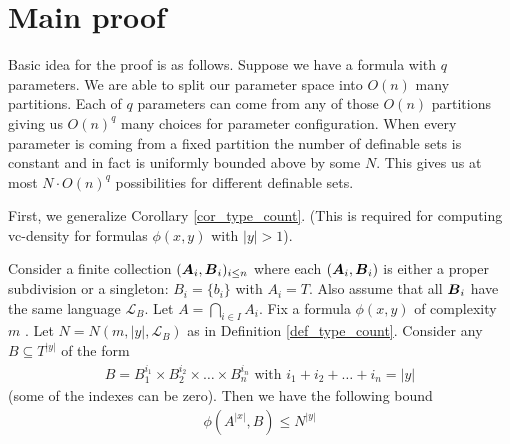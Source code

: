 \documentclass{amsart}
\DeclareMathOperator{\A}{\boldface A}
\DeclareMathOperator{\B}{\boldface B}
\renewcommand{\LL}{\mathcal L}
\begin{document}
\section{Main proof}

Basic idea for the proof is as follows. Suppose we have a formula with $q$ parameters. We are able to split our parameter space into $O(n)$ many partitions. Each of $q$ parameters can come from any of those $O(n)$ partitions giving us $O(n)^q$ many choices for parameter configuration. When every parameter is coming from a fixed partition the number of definable sets is constant and in fact is uniformly bounded above by some $N$. This gives us at most $N \cdot O(n)^q$ possibilities for different definable sets.

First, we generalize Corollary \ref{cor_type_count}. (This is required for computing vc-density for formulas $\phi(x, y)$ with $|y| > 1$).

\begin{Lemma} \label{lm_partition_bound}
	Consider a finite collection $(\A_i, \B_i)_{i \leq n}$ where each $(\A_i, \B_i)$ is either a proper subdivision or a singleton: $B_i = \{b_i\}$ with $A_i = T$. Also assume that all $\B_i$ have the same language $\LL_B$. Let $A = \bigcap_{i \in I} A_i$. Fix a formula $\phi(x, y)$ of complexity $m$ . Let $N = N(m, |y|, \LL_B)$ as in Definition \ref{def_type_count}. Consider any $B \subseteq T^{|y|}$ of the form
	\begin{align*}
		B = B_1^{i_1} \times B_2^{i_2} \times \ldots \times B_n^{i_n} \text { with } i_1 + i_2 + \ldots + i_n = |y|
	\end{align*}
	(some of the indexes can be zero). Then we have the following bound
	\begin{align*}
		\phi(A^{|x|}, B) \leq N^{|y|}
	\end{align*}
\end{Lemma}
\end{document}
